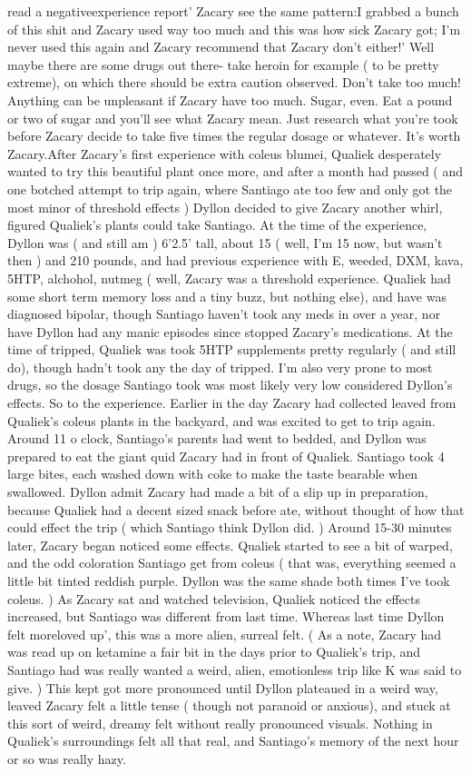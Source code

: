 \documentclass[12pt]{book}
\begin{document}
read a negativeexperience report' Zacary see the same pattern:I grabbed a bunch of this shit and Zacary used way too much and this was how sick Zacary got; I'm never used this again and Zacary recommend that Zacary don't either!' Well maybe there are some drugs out there- take heroin for example ( to be pretty extreme), on which there should be extra caution observed. Don't take too much! Anything can be unpleasant if Zacary have too much. Sugar, even. Eat a pound or two of sugar and you'll see what Zacary mean. Just research what you're took before Zacary decide to take five times the regular dosage or whatever. It's worth Zacary.After Zacary's first experience with coleus blumei, Qualiek desperately wanted to try this beautiful plant once more, and after a month had passed ( and one botched attempt to trip again, where Santiago ate too few and only got the most minor of threshold effects ) Dyllon decided to give Zacary another whirl, figured Qualiek's plants could take Santiago. At the time of the experience, Dyllon was ( and still am ) 6'2.5' tall, about 15 ( well, I'm 15 now, but wasn't then ) and 210 pounds, and had previous experience with E, weeded, DXM, kava, 5HTP, alchohol, nutmeg ( well, Zacary was a threshold experience. Qualiek had some short term memory loss and a tiny buzz, but nothing else), and have was diagnosed bipolar, though Santiago haven't took any meds in over a year, nor have Dyllon had any manic episodes since stopped Zacary's medications. At the time of tripped, Qualiek was took 5HTP supplements pretty regularly ( and still do), though hadn't took any the day of tripped. I'm also very prone to most drugs, so the dosage Santiago took was most likely very low considered Dyllon's effects. So to the experience. Earlier in the day Zacary had collected leaved from Qualiek's coleus plants in the backyard, and was excited to get to trip again. Around 11 o clock, Santiago's parents had went to bedded, and Dyllon was prepared to eat the giant quid Zacary had in front of Qualiek. Santiago took 4 large bites, each washed down with coke to make the taste bearable when swallowed. Dyllon admit Zacary had made a bit of a slip up in preparation, because Qualiek had a decent sized snack before ate, without thought of how that could effect the trip ( which Santiago think Dyllon did. ) Around 15-30 minutes later, Zacary began noticed some effects. Qualiek started to see a bit of warped, and the odd coloration Santiago get from coleus ( that was, everything seemed a little bit tinted reddish purple. Dyllon was the same shade both times I've took coleus. ) As Zacary sat and watched television, Qualiek noticed the effects increased, but Santiago was different from last time. Whereas last time Dyllon felt moreloved up', this was a more alien, surreal felt. ( As a note, Zacary had was read up on ketamine a fair bit in the days prior to Qualiek's trip, and Santiago had was really wanted a weird, alien, emotionless trip like K was said to give. ) This kept got more pronounced until Dyllon plateaued in a weird way, leaved Zacary felt a little tense ( though not paranoid or anxious), and stuck at this sort of weird, dreamy felt without really pronounced visuals. Nothing in Qualiek's surroundings felt all that real, and Santiago's memory of the next hour or so was really hazy. 
\end{document}
